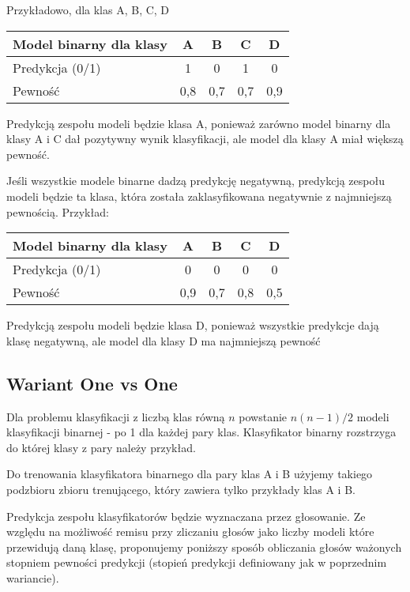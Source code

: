 \documentclass{article}
\begin{document}
Przykładowo, dla klas A, B, C, D

\begin{table}[ht]
\centering
\begin{tabular}{|l|c|c|c|c|}
\hline
Model binarny dla klasy & A & B & C & D \\ \hline
Predykcja (0/1)         & 1 & 0 & 1 & 0 \\
Pewność                 & 0,8 & 0,7 & 0,7 & 0,9 \\ \hline
\end{tabular}
\label{tab:ovr-example-1}
\end{table}

Predykcją zespołu modeli będzie klasa A, ponieważ zarówno model binarny dla klasy A i C dał pozytywny wynik klasyfikacji, ale model dla klasy A miał większą pewność.

Jeśli wszystkie modele binarne dadzą predykcję negatywną, predykcją zespołu modeli będzie ta klasa, która została zaklasyfikowana negatywnie z najmniejszą pewnością. Przykład:

\begin{table}[ht]
\centering
\begin{tabular}{|l|c|c|c|c|}
\hline
Model binarny dla klasy & A & B & C & D \\ \hline
Predykcja (0/1)         & 0 & 0 & 0 & 0 \\
Pewność                 & 0,9 & 0,7 & 0,8 & 0,5 \\ \hline
\end{tabular}
\label{tab:binary-models}
\end{table}

Predykcją zespołu modeli będzie klasa D, ponieważ wszystkie predykcje dają klasę negatywną, ale model dla klasy D ma najmniejszą pewność

\subsection{Wariant One vs One}
Dla problemu klasyfikacji z liczbą klas równą $n$ powstanie $n(n-1)/2$ modeli klasyfikacji binarnej - po 1 dla każdej pary klas.
Klasyfikator binarny rozstrzyga do której klasy z pary należy przykład.

Do trenowania klasyfikatora binarnego dla pary klas A i B użyjemy takiego podzbioru zbioru trenującego, który zawiera tylko przykłady klas A i B.

Predykcja zespołu klasyfikatorów będzie wyznaczana przez głosowanie.
Ze względu na możliwość remisu przy zliczaniu głosów jako liczby modeli które przewidują daną klasę, proponujemy poniższy sposób obliczania głosów ważonych stopniem pewności predykcji
(stopień predykcji definiowany jak w poprzednim wariancie).
\end{document}
